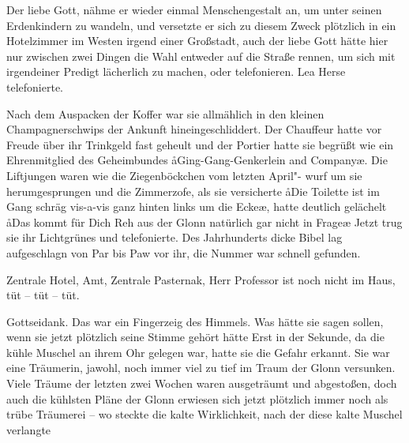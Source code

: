 

Der liebe Gott, nähme er wieder einmal Menschengestalt an,
um unter seinen Erdenkindern zu wandeln, und versetzte er
sich zu diesem Zweck plötzlich in ein Hotelzimmer im Westen
irgend einer Großstadt, auch der liebe Gott hätte hier nur
zwischen zwei Dingen die Wahl\dopp{} entweder auf die Straße
rennen, um sich mit irgendeiner Predigt lächerlich zu machen,
oder telefonieren. Lea Herse telefonierte.

Nach dem Auspacken der Koffer war sie allmählich in den
kleinen Champagnerschwips der Ankunft hineingeschliddert.
Der Chauffeur hatte vor Freude über ihr Trinkgeld fast geheult
und der Portier hatte sie begrüßt wie ein Ehrenmitglied des
Geheimbundes \aa{}Ging-Gang-Genkerlein and Company\ae{}. Die
Liftjungen waren wie die Ziegenböckchen vom letzten April"-%
wurf um sie herumgesprungen und die Zimmerzofe, als sie
versicherte\dopp{} \aa{}Die Toilette ist im Gang schräg vis-a-vis ganz
hinten links um die Ecke\ae{}, hatte deutlich gelächelt\dopp{} \aa{}Das
kommt für Dich Reh aus der Glonn natürlich gar nicht in
Frage\ausr{}\ae{} Jetzt trug sie ihr Lichtgrünes und telefonierte. Des
Jahrhunderts dicke Bibel lag aufgeschlagn von Par bis Paw
vor ihr, die Nummer war schnell gefunden.

Zentrale Hotel, Amt, Zentrale Pasternak, Herr Professor
ist noch nicht im Haus, tüt -- tüt -- tüt.

Gottseidank. Das war ein Fingerzeig des Himmels. Was hätte
sie sagen sollen, wenn sie jetzt plötzlich seine Stimme gehört
hätte\frag{} Erst in der Sekunde, da die kühle Muschel an ihrem
Ohr gelegen war, hatte sie die Gefahr erkannt. Sie war eine
Träumerin, jawohl, noch immer viel zu tief im Traum der
Glonn versunken. Viele Träume der letzten zwei Wochen
waren ausgeträumt und abgestoßen, doch auch die kühlsten
Pläne der Glonn erwiesen sich jetzt plötzlich immer noch als
trübe Träumerei -- wo steckte die kalte Wirklichkeit, nach der
diese kalte Muschel verlangte\frag{}

